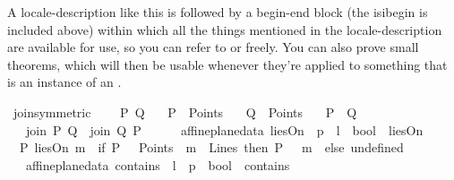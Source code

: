 \begin{isabellebody}
\begin{isamarkuptext}
A locale-description like this is followed by a begin-end block (the isi{begin} is included above)
 within which all the things mentioned
in the locale-description are available for use, so you can refer to  or  
freely. You can also prove small theorems, which will then be usable whenever they're applied to 
something that is an instance of an .%
\end{isamarkuptext}\isamarkuptrue%
\isamarkupfalse%
\ join{\isacharunderscore}{\kern0pt}symmetric{\isacharcolon}{\kern0pt}\ \isanewline
\ \ \ P\ Q\isanewline
\ \ \ {\isachardoublequoteopen}P\ {\isasymin}\ Points{\isachardoublequoteclose}\isanewline
\ \ \ {\isachardoublequoteopen}Q\ {\isasymin}\ Points{\isachardoublequoteclose}\isanewline
\ \ \ {\isachardoublequoteopen}P\ {\isasymnoteq}\ Q{\isachardoublequoteclose}\ \isanewline
\ \ \ {\isachardoublequoteopen}join\ P\ Q\ {\isacharequal}{\kern0pt}\ join\ Q\ P{\isachardoublequoteclose}\ \isanewline
%
\isadelimproof
\ \ %
\endisadelimproof
%
\isatagproof
{}\isamarkupfalse%
%
\endisatagproof
{\isafoldproof}%
%
\isadelimproof
\isanewline
%
\endisadelimproof
\isanewline
{}\isamarkupfalse%
\ {\isacharparenleft}{\kern0pt}\ affine{\isacharunderscore}{\kern0pt}plane{\isacharunderscore}{\kern0pt}data{\isacharparenright}{\kern0pt}\ liesOn\ {\isacharcolon}{\kern0pt}{\isacharcolon}{\kern0pt}\ {\isachardoublequoteopen}{\isacharprime}{\kern0pt}p\ {\isasymRightarrow}\ {\isacharprime}{\kern0pt}l\ {\isasymRightarrow}\ bool{\isachardoublequoteclose}\ {\isacharparenleft}{\kern0pt}\ {\isachardoublequoteopen}liesOn{\isachardoublequoteclose}\ {}{}{\isacharparenright}{\kern0pt}\ \isanewline
\ \ {\isachardoublequoteopen}P\ liesOn\ m\ {\isacharequal}{\kern0pt}\ {\isacharparenleft}{\kern0pt}if\ P\ \ {\isasymin}\ Points\ {\isasymand}\ {\isacharparenleft}{\kern0pt}m\ {\isasymin}\ Lines{\isacharparenright}{\kern0pt}\ then\ P\ {\isasymlhd}\ \ m\ \ else\ undefined{\isacharparenright}{\kern0pt}{\isachardoublequoteclose}\isanewline
\isanewline
{}\isamarkupfalse%
\ \ {\isacharparenleft}{\kern0pt}\ affine{\isacharunderscore}{\kern0pt}plane{\isacharunderscore}{\kern0pt}data{\isacharparenright}{\kern0pt}\ contains\ {\isacharcolon}{\kern0pt}{\isacharcolon}{\kern0pt}\ {\isachardoublequoteopen}{\isacharprime}{\kern0pt}l\ {\isasymRightarrow}\ {\isacharprime}{\kern0pt}p\ {\isasymRightarrow}\ bool{\isachardoublequoteclose}\ {\isacharparenleft}{\kern0pt}\ {\isachardoublequoteopen}contains{\isachardoublequoteclose}\ {}{}{\isacharparenright}{\kern0pt}\ \isanewline

\end{isabellebody}
